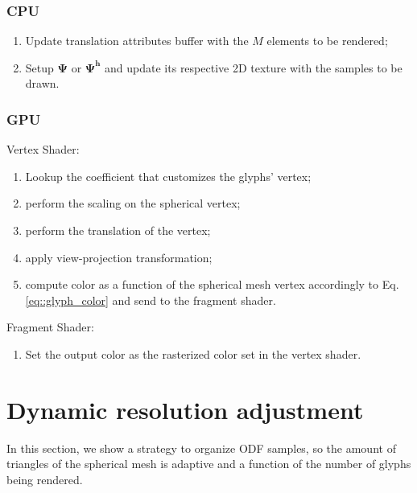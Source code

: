 \documentclass[twoside,twocolumn,10pt]{article}
\begin{document}
\subsubsection{CPU}
\begin{enumerate}
    \item Update translation attributes buffer with the $M$ elements to be rendered;
    \item Setup $\bm{\Psi}$ or $\bm{\Psi^h}$ and update its respective 2D texture with the samples to be drawn.
\end{enumerate}

\subsubsection{GPU}
Vertex Shader:
\begin{enumerate}
    \item Lookup the coefficient that customizes the glyphs' vertex; 
    \item perform the scaling on the spherical vertex;
    \item perform the translation of the vertex;
    \item apply view-projection transformation;
    \item compute color as a function of the spherical mesh vertex accordingly to Eq. \ref{eq::glyph_color} and send to the fragment shader.
\end{enumerate}

Fragment Shader:
\begin{enumerate}
    \item Set the output color as the rasterized color set in the vertex shader.
\end{enumerate}






\section{Dynamic resolution adjustment}

In this section, we show a strategy to organize ODF samples, so the amount of triangles of the spherical mesh is adaptive and a function of the number of glyphs being rendered.
\end{document}
